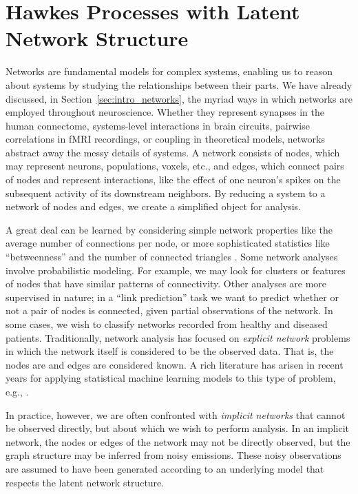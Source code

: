 
\chapter{Hawkes Processes with Latent Network Structure}
\label{chap:three}

Networks are fundamental models for complex systems, enabling us to
reason about systems by studying the relationships between their
parts. We have already discussed, in Section~\ref{sec:intro_networks},
the myriad ways in which networks are employed throughout
neuroscience.  Whether they represent synapses in the human
connectome, systems-level interactions in brain circuits, pairwise
correlations in fMRI recordings, or coupling in theoretical models,
networks abstract away the messy details of systems.  A network consists of nodes, which
may represent neurons, populations, voxels, etc., and edges, 
which connect pairs of nodes and represent interactions, like the effect
of one neuron's spikes on the subsequent activity of its downstream
neighbors.  By reducing a system to a network of nodes and edges,
we create a simplified object for analysis.

A great deal can be learned by considering simple network properties
like the average number of connections per node, or more sophisticated
statistics like ``betweenness'' and the number of connected triangles
\cite{bullmore2009complex}.  Some network analyses involve
probabilistic modeling.  For example, we may look for clusters or
features of nodes that have similar patterns of connectivity.  Other
analyses are more supervised in nature; in a ``link
prediction'' task we want to predict whether or not a pair of nodes is
connected, given partial observations of the network. In some cases,
 we wish to classify networks recorded from healthy and diseased patients. 
 Traditionally, network analysis has focused on \emph{explicit network} problems in
which the network itself is considered to be the observed data.  That
is, the nodes are and edges are considered known. A rich literature has arisen in recent
years for applying statistical machine learning models to this type of
problem, e.g., \citet{Liben-2007,Hoff-2008,Goldenberg-2010}.

In practice, however, we are often confronted with \emph{implicit
  networks} that cannot be observed directly, but about which we wish
to perform analysis.  In an implicit network, the nodes or edges of
the network may not be directly observed, but the graph structure may
be inferred from noisy emissions.  These noisy observations are
assumed to have been generated according to an underlying model that
respects the latent network structure.


